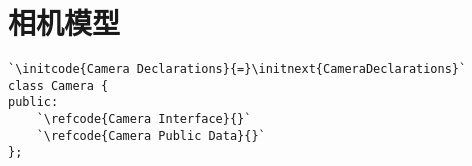 \section{相机模型}\label{sec:相机模型}

\label{code:overview_Camera}
\begin{lstlisting}
`\initcode{Camera Declarations}{=}\initnext{CameraDeclarations}`
class Camera {
public:
    `\refcode{Camera Interface}{}`
    `\refcode{Camera Public Data}{}`
};
\end{lstlisting}